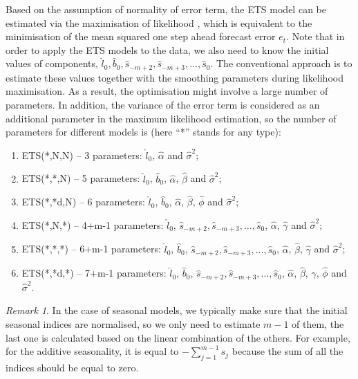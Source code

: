 \documentclass[
]{book}
\providecommand{\tightlist}{%
  \setlength{\itemsep}{0pt}\setlength{\parskip}{0pt}}
\theoremstyle{definition}
\theoremstyle{definition}
\theoremstyle{definition}
\theoremstyle{definition}
\theoremstyle{remark}
\newtheorem*{remark}{Remark}
\begin{document}
Based on the assumption of normality of error term, the ETS model can be estimated via the maximisation of likelihood \citep[see Chapter 13 of][]{SvetunkovSBA}, which is equivalent to the minimisation of the mean squared one step ahead forecast error \(e_t\). Note that in order to apply the ETS models to the data, we also need to know the initial values of components, \(\hat{l}_0, \hat{b}_0, \hat{s}_{-m+2}, \hat{s}_{-m+3}, \dots, \hat{s}_{0}\). The conventional approach is to estimate these values together with the smoothing parameters during likelihood maximisation. As a result, the optimisation might involve a large number of parameters. In addition, the variance of the error term is considered as an additional parameter in the maximum likelihood estimation, so the number of parameters for different models is (here ``*'' stands for any type):

\begin{enumerate}
\def\labelenumi{\arabic{enumi}.}
\tightlist
\item
  ETS(*,N,N) -- 3 parameters: \(\hat{l}_0\), \(\hat{\alpha}\) and \(\hat{\sigma}^2\);
\item
  ETS(*,*,N) -- 5 parameters: \(\hat{l}_0\), \(\hat{b}_0\), \(\hat{\alpha}\), \(\hat{\beta}\) and \(\hat{\sigma}^2\);
\item
  ETS(*,*d,N) -- 6 parameters: \(\hat{l}_0\), \(\hat{b}_0\), \(\hat{\alpha}\), \(\hat{\beta}\), \(\hat{\phi}\) and \(\hat{\sigma}^2\);
\item
  ETS(*,N,*) -- 4+m-1 parameters: \(\hat{l}_0\), \(\hat{s}_{-m+2}, \hat{s}_{-m+3}, \dots, \hat{s}_{0}\), \(\hat{\alpha}\), \(\hat{\gamma}\) and \(\hat{\sigma}^2\);
\item
  ETS(*,*,*) -- 6+m-1 parameters: \(\hat{l}_0\), \(\hat{b}_0\), \(\hat{s}_{-m+2}, \hat{s}_{-m+3}, \dots, \hat{s}_{0}\), \(\hat{\alpha}\), \(\hat{\beta}\), \(\hat{\gamma}\) and \(\hat{\sigma}^2\);
\item
  ETS(*,*d,*) -- 7+m-1 parameters: \(\hat{l}_0\), \(\hat{b}_0\), \(\hat{s}_{-m+2}, \hat{s}_{-m+3}, \dots, \hat{s}_{0}\), \(\hat{\alpha}\), \(\hat{\beta}\), \(\hat{\gamma}\), \(\hat{\phi}\) and \(\hat{\sigma}^2\).
\end{enumerate}

\begin{remark}
In the case of seasonal models, we typically make sure that the initial seasonal indices are normalised, so we only need to estimate \(m-1\) of them, the last one is calculated based on the linear combination of the others. For example, for the additive seasonality, it is equal to \(-\sum_{j=1}^{m-1} s_j\) because the sum of all the indices should be equal to zero.
\end{remark}
\end{document}
